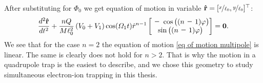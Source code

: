 After substituting for $\Phi_0$ we get equation of motion in variable $\vb{\hat{r}} = [\nicefrac{x}{\ell_0},\nicefrac{y}{\ell_0}]^\top$:
\begin{equation}
	\label{eq of motion multipole}
	\dfrac{d^2\vb{\hat{r}}}{dt^2} + \dfrac{n Q}{M \ell_0^2}\left(V_0 + V_1\right)\cos(\Omega_1 t) \hat{r}^{n-1}
	\begin{bmatrix}
		\minus\cos\big((n \minus 1)\varphi\big) \\
		\sin\big((n \minus 1)\varphi\big)
	\end{bmatrix} = \vb{0}.
\end{equation}
We see that for the case $n = 2$ the equation of motion \eqref{eq of motion multipole} is linear. The same is clearly does not hold for $n > 2$. That is why the motion in a quadrupole trap is the easiest to describe, and we chose this geometry to study simultaneous electron-ion trapping in this thesis.

